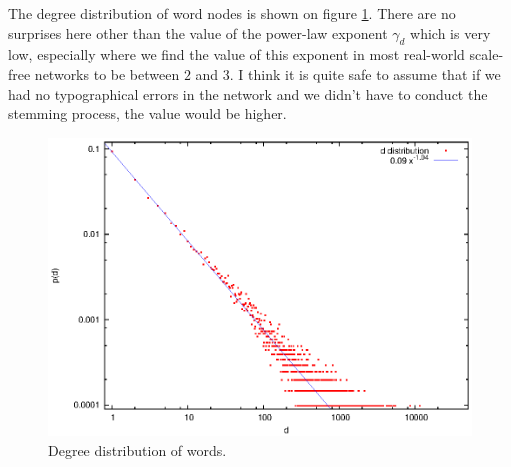     The degree distribution of word nodes is shown on figure \ref{fig:degdist_words}. There are no surprises here other than the value of the power-law exponent $\gamma_d$ which is very low, especially where we find the value of this exponent in most real-world scale-free networks to be between $2$ and $3$. I think it is quite safe to assume that if we had no typographical errors in the network and we didn't have to conduct the stemming process, the value would be higher.
    \begin{figure}[H]
      \centering
      \includegraphics[width=\textwidth]{chapters/03_implementation/degdist_words}
      \caption{Degree distribution of words.}
      \label{fig:degdist_words}
    \end{figure}
